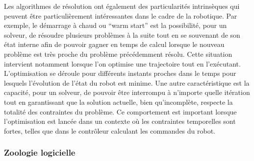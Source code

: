 %
Les algorithmes de résolution ont également des particularités
intrinsèques qui peuvent être particulièrement intéressantes dans le
cadre de la robotique. Par exemple, le démarrage à chaud ou ``warm
start''   est la possibilité, pour un solveur, de résoudre
plusieurs problèmes à la suite tout en se souvenant de son état
interne afin de pouvoir gagner en temps de calcul lorsque le nouveau
problème est très proche du problème précédemment résolu. Cette
situation intervient notamment lorsque l'on optimise une trajectoire
tout en l'exécutant. L'optimisation se déroule pour différents
instants proches dans le temps pour lesquels l'évolution de l'état du
robot est minime. Une autre caractéristique est la capacité, pour un
solveur, de pouvoir être interrompu à n'importe quelle itération tout
en garantissant que la solution actuelle, bien qu'incomplète,
respecte la totalité des contraintes du problème. Ce comportement est
important lorsque l'optimisation est lancée dans un contexte où les
contraintes temporelles sont fortes, telles que dans le contrôleur
calculant les commandes du robot.



\subsubsection{Zoologie logicielle}\label{sec:chap1_optim_solv_zoosoft}


